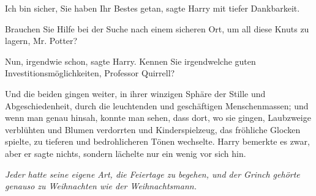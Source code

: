 \glqq{}Ich bin sicher, Sie haben Ihr Bestes getan\grqq{}, sagte Harry mit tiefer
Dankbarkeit.

\glqq{}Brauchen Sie Hilfe bei der Suche nach einem sicheren Ort, um all diese
Knuts zu lagern, Mr. Potter?\grqq{}

\glqq{}Nun, irgendwie schon\grqq{}, sagte Harry. \glqq{}Kennen Sie irgendwelche
guten Investitionsmöglichkeiten, Professor Quirrell?\grqq{}

Und die beiden gingen weiter, in ihrer winzigen Sphäre der Stille und
Abgeschiedenheit, durch die leuchtenden und geschäftigen Menschenmassen; und
wenn man genau hinsah, konnte man sehen, dass dort, wo sie gingen, Laubzweige
verblühten und Blumen verdorrten und Kinderspielzeug, das fröhliche Glocken
spielte, zu tieferen und bedrohlicheren Tönen wechselte. Harry bemerkte es zwar,
aber er sagte nichts, sondern lächelte nur ein wenig vor sich hin.

\emph{Jeder hatte seine eigene Art, die Feiertage zu begehen, und der Grinch
gehörte genauso zu Weihnachten wie der Weihnachtsmann.}

